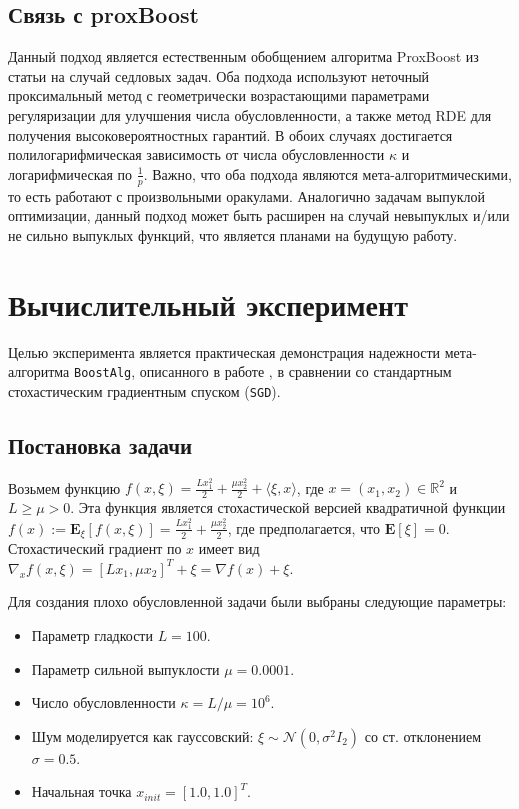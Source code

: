 \subsection{Связь с \textrm{proxBoost}}

Данный подход является естественным обобщением алгоритма ProxBoost из статьи \cite{davis2021low} на случай седловых задач. Оба подхода используют неточный проксимальный метод с геометрически возрастающими параметрами регуляризации для улучшения числа обусловленности, а также метод RDE для получения высоковероятностных гарантий. В обоих случаях достигается полилогарифмическая зависимость от числа обусловленности $\kappa$ и логарифмическая по $\frac{1}{p}$. Важно, что оба подхода являются
мета-алгоритмическими, то есть работают с произвольными оракулами. Аналогично задачам выпуклой оптимизации, данный подход может быть расширен на случай невыпуклых и/или не сильно выпуклых функций, что является планами на будущую работу.

\section{Вычислительный эксперимент}

Целью эксперимента является практическая демонстрация надежности мета-алгоритма \texttt{BoostAlg}, описанного в работе \cite{davis2021low}, в сравнении со стандартным стохастическим градиентным спуском (\texttt{SGD}).

\subsection{Постановка задачи}

Возьмем функцию $f(x, \xi) = \frac{Lx_1^2}{2} + \frac{\mu x_2^2}{2} + \langle \xi, x \rangle$, где $x = (x_1, x_2) \in \mathbb{R}^2$ и $L \ge \mu > 0$. Эта функция является стохастической версией квадратичной функции $f(x) := \mathbf{E}_{\xi} [f(x, \xi)] = \frac{Lx_1^2}{2} + \frac{\mu x_2^2}{2}$, где предполагается, что $\mathbf{E}[\xi] = 0$. Стохастический градиент по $x$ имеет вид $\nabla_x f(x, \xi) = [Lx_1, \mu x_2]^T + \xi = \nabla f(x) + \xi$.

Для создания плохо обусловленной задачи были выбраны следующие параметры:
\begin{itemize}
    \item Параметр гладкости $L = 100$.
    \item Параметр сильной выпуклости $\mu = 0.0001$.
    \item Число обусловленности $\kappa = L/\mu = 10^6$.
    \item Шум моделируется как гауссовский: $\xi \sim \mathcal{N}(0, \sigma^2 I_2)$ со ст. отклонением $\sigma = 0.5$.
    \item Начальная точка $x_{init} = [1.0, 1.0]^T$.
\end{itemize}

